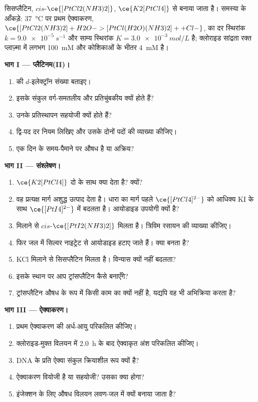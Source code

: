 \begin{problem}
\label{pb:b3:complex-mechanisms:1}
सिसप्लैटिन, $cis$-$\ce{[PtCl2(NH3)2]}$, $\ce{K2[PtCl4]}$ से बनाया जाता है। समस्या के आँकड़े:
\qty{37}{\celsius} पर प्रथम ऐक्वाकरण, $\ce{[PtCl2(NH3)2] + H2O -> [PtCl(H2O)(NH3)2]+ + Cl-}$, का
दर स्थिरांक $k = \qty{9.0e-5}{s^{-1}}$ और साम्य स्थिरांक $K = \qty{3.0e-3}{mol/L}$ है;
क्लोराइड सांद्रता रक्त प्लाज़्मा में लगभग \qty{100}{mM} और कोशिकाओं के भीतर \qty{4}{mM} है।

\medskip\noindent\textbf{भाग I --- प्लैटिनम(II)।}
\begin{enumerate}
  \item {} की $d$-इलेक्ट्रॉन संख्या बताइए।
  \item इसके संकुल वर्ग-समतलीय और प्रतिचुंबकीय क्यों होते हैं?
  \item उनके प्रतिस्थापन सहयोजी क्यों होते हैं?
  \item द्वि-पद दर नियम लिखिए और उसके दोनों पदों की व्याख्या कीजिए।
  \item एक दिन के समय-पैमाने पर औषध  है या अक्रिय?
\end{enumerate}

\medskip\noindent\textbf{भाग II --- संश्लेषण।}
\begin{enumerate}[resume]
  \item $\ce{K2[PtCl4]}$ दो  के साथ क्या देता है? क्यों?
  \item वह प्रत्यक्ष मार्ग अशुद्ध उत्पाद देता है। धारा का मार्ग पहले
        $\ce{[PtCl4]^{2-}}$ को आधिक्य KI के साथ $\ce{[PtI4]^{2-}}$ में बदलता है। आयोडाइड उपयोगी क्यों है?
  \item {} मिलाने से $cis$-$\ce{[PtI2(NH3)2]}$ मिलता है। त्रिविम रसायन की व्याख्या कीजिए।
  \item फिर जल में सिल्वर नाइट्रेट से आयोडाइड हटाए जाते हैं। क्या बनता है?
  \item KCl मिलाने से सिसप्लैटिन मिलता है। विन्यास क्यों नहीं बदलता?
  \item इसके स्थान पर आप ट्रांसप्लैटिन कैसे बनाएँगे?
  \item ट्रांसप्लैटिन औषध के रूप में किसी काम का क्यों नहीं है, यद्यपि वह भी अभिक्रिया करता है?
\end{enumerate}

\medskip\noindent\textbf{भाग III --- ऐक्वाकरण।}
\begin{enumerate}[resume]
  \item प्रथम ऐक्वाकरण की अर्ध-आयु परिकलित कीजिए।
  \item क्लोराइड-मुक्त विलयन में \qty{2.0}{h} के बाद ऐक्वाकृत अंश परिकलित कीजिए।
  \item DNA के प्रति ऐक्वा संकुल क्रियाशील रूप क्यों है?
  \item ऐक्वाकरण वियोजी है या सहयोजी? उसका  क्या होगा?
  \item इंजेक्शन के लिए औषध विलयन लवण-जल में क्यों बनाया जाता है?
\end{enumerate}


\end{problem}
